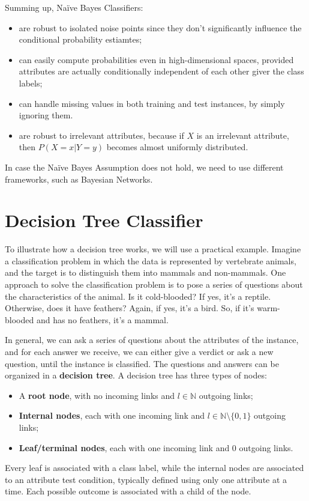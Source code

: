 Summing up, Naïve Bayes Classifiers:
\begin{itemize}
    \item are robust to isolated noise points since they don't significantly influence the conditional probability estiamtes;
    \item can easily compute probabilities even in high-dimensional spaces, provided attributes are actually conditionally independent of each other giver the class labels;
    \item can handle missing values in both training and test instances, by simply ignoring them.
    \item are robust to irrelevant attributes, because if $X$ is an irrelevant attribute, then $P(X=x|Y=y)$ becomes almost uniformly distributed.
\end{itemize}
In case the Naïve Bayes Assumption does not hold, we need to use different frameworks, such as Bayesian Networks.

\section{Decision Tree Classifier}

To illustrate how a decision tree works, we will use a practical example. Imagine a classification problem in which the data is represented by vertebrate animals, and the target is to distinguish them into mammals and non-mammals. One approach to solve the classification problem is to pose a series of questions about the characteristics of the animal. Is it cold-blooded? If yes, it's a reptile. Otherwise, does it have feathers? Again, if yes, it's a bird. So, if it's warm-blooded and has no feathers, it's a mammal.

In general, we can ask a series of questions about the attributes of the instance, and for each answer we receive, we can either give a verdict or ask a new question, until the instance is classified. The questions and answers can be organized in a \textbf{decision tree}. A decision tree has three types of nodes:
\begin{itemize}
    \item A \textbf{root node}, with no incoming links and $l \in \mathbb{N}$ outgoing links;
    \item \textbf{Internal nodes}, each with one incoming link and $l \in \mathbb{N} \setminus \{0,1\}$ outgoing links;
    \item \textbf{Leaf/terminal nodes}, each with one incoming link and 0 outgoing links.
\end{itemize}
Every leaf is associated with a class label, while the internal nodes are associated to an attribute test condition, typically defined using only one attribute at a time. Each possible outcome is associated with a child of the node.

